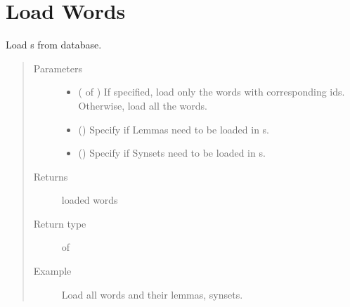 \documentclass[letterpaper,10pt,english]{sphinxmanual}
\begin{document}
\section{Load Words}
\label{\detokenize{index:module-loacore.load.word_load}}\label{\detokenize{index:load-words}}

\begin{fulllineitems}
\label{\detokenize{index:loacore.load.word_load.load_words}}
Load  s from database.
\begin{quote}\begin{description}
\item[{Parameters}] \leavevmode\begin{itemize}
\item {} 
 ( of ) \textendash{} If specified, load only the words with corresponding ids. Otherwise, load all the words.

\item {} 
 () \textendash{} Specify if Lemmas need to be loaded in  s.

\item {} 
 () \textendash{} Specify if Synsets need to be loaded in  s.

\end{itemize}

\item[{Returns}] \leavevmode
loaded words

\item[{Return type}] \leavevmode
{} of 

\item[{Example}] \leavevmode
Load all words and their lemmas, synsets.


\end{description}
\end{quote}
\end{fulllineitems}
\end{document}
